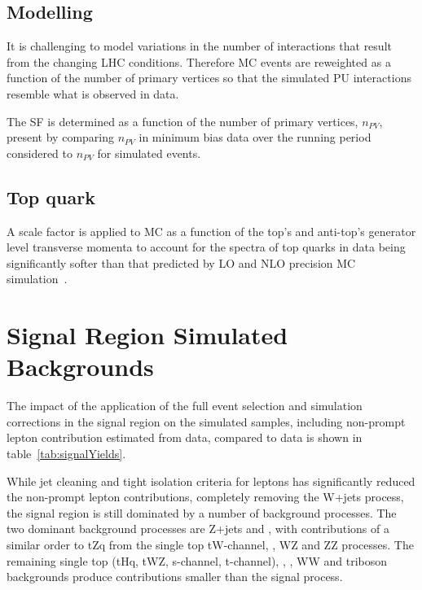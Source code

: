 \subsection{\PU Modelling}\label{subsec:puSF}
It is challenging to model variations in the number of \PU interactions that result from the changing LHC conditions.
Therefore MC events are reweighted as a function of the number of primary vertices so that the simulated PU interactions resemble what is observed in data.

The \PU SF is determined as a function of the number of primary vertices, $n_{PV}$, present by comparing $n_{PV}$ in minimum bias data over the running period considered to $n_{PV}$ for simulated events.

\subsection{Top quark \pt}
A scale factor is applied to \ttbar MC as a function of the top's and anti-top's generator level transverse momenta to account for the \pt spectra of top quarks in data being significantly softer than that predicted by LO and NLO precision MC simulation~\cite{Khachatryan:2015oqa}.


\section{Signal Region Simulated Backgrounds}\label{sec:simBackgrounds}
The impact of the application of the full event selection and simulation corrections in the signal region on the simulated samples, including non-prompt lepton contribution estimated from data, compared to data is shown in table~\ref{tab:signalYields}.

While jet cleaning and tight isolation criteria for leptons has significantly reduced the non-prompt lepton contributions, completely removing the W+jets process, the signal region is still dominated by a number of background processes.
The two dominant background processes are Z+jets and \ttbar, with contributions of a similar order to tZq from the single top tW-channel, \ttbarZ, WZ and ZZ processes.
The remaining single top (tHq, tWZ, s-channel, t-channel), \ttbarW, \ttbarH, WW and triboson backgrounds produce contributions smaller than the signal process.

